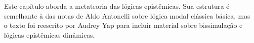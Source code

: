 \documentclass[../../../include/open-logic-chapter]{subfiles}
\begin{document}

\begin{editorial}
  Este capítulo aborda a metateoria das lógicas epistêmicas. Sua estrutura é semelhante à das notas de Aldo Antonelli sobre lógica modal clássica básica, mas o texto foi reescrito por Audrey Yap para incluir material sobre bissimulação e lógicas epistêmicas dinâmicas.
\end{editorial}



\OLEndPartHook
\end{document}
